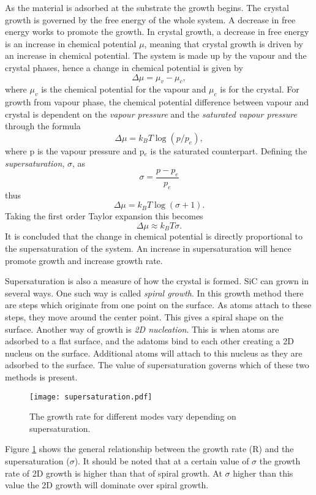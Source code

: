  As the material is adsorbed at the substrate the growth begins. The crystal growth is governed by the free energy of the whole system. A decrease in free energy works to promote the growth. In crystal growth, a decrease in free energy is an increase in chemical potential $\mu$, meaning that crystal growth is driven by an increase in chemical potential. The system is made up by the vapour and the crystal phases, hence a change in chemical potential is given by 
 \[\Delta \mu = \mu_v -\mu_c,\]
where $\mu_v$ is the chemical potential for the vapour and $\mu_c$ is for the crystal. For growth from vapour phase, the chemical potential difference between vapour and crystal is dependent on the \emph{vapour pressure} and the \emph{saturated vapour pressure} through the formula
 \[\Delta \mu = k_BT\log(p/p_e),\]
where p is the vapour pressure and p$_e$ is the saturated counterpart. Defining the \emph{supersaturation}, $\sigma$, as
\[\sigma = \frac{p-p_e}{p_e}\]
thus
 \[\Delta \mu = k_BT\log(\sigma+1).\]
Taking the first order Taylor expansion this becomes
\[\Delta \mu \approx k_BT\sigma.\]
 It is concluded that the change in chemical potential is directly proportional to the supersaturation of the system. An increase in supersaturation will hence promote growth and increase growth rate. 
 
 Supersaturation is also a measure of how the crystal is formed. SiC can grown in several ways. One such way is called \emph{spiral growth}. In this growth method there are steps which originate from one point on the surface. As atoms attach to these steps, they move around the center point. This gives a spiral shape on the surface. Another way of growth is \emph{2D nucleation}. This is when atoms are adsorbed to a flat surface, and the adatoms bind to each other creating a 2D nucleus on the surface. Additional atoms will attach to this nucleus as they are adsorbed to the surface. The value of supersaturation governs which of these two methods is present. 
 
\begin{figure}[h]
\begin{center}
\texttt{[image: supersaturation.pdf]}
\caption{The growth rate for different modes vary depending on supersaturation. 
\label{fig:supersaturation}}
\end{center}
\end{figure}
 
 Figure \ref{fig:supersaturation} shows the general relationship between the growth rate (R) and the supersaturation ($\sigma$). It should be noted that at a certain value of $\sigma$ the growth rate of 2D growth is higher than that of spiral growth. At $\sigma$ higher than this value the 2D growth will dominate over spiral growth. 
 
